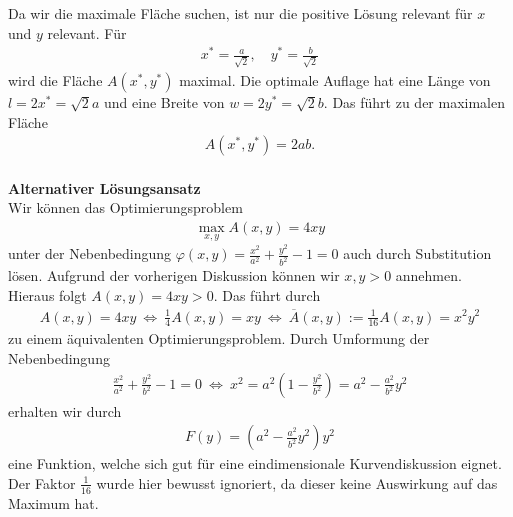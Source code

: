 Da wir die maximale Fläche suchen, ist nur die positive Lösung relevant für $ x $ und $ y $ relevant. Für 
\begin{align*}
	x^\ast = \frac{a}{\sqrt{2}}, \quad y^\ast = \frac{b}{\sqrt{2}}
\end{align*}  
wird die Fläche $ A(x^\ast, y^\ast ) $ maximal. Die optimale Auflage hat eine Länge von $ l = 2 x^\ast = \sqrt{2} a  $ und eine Breite von $ w = 2 y^\ast = \sqrt{2} b  $.
Das führt zu der maximalen Fläche 
\begin{align*}
	A(x^\ast, y^\ast) = 2 ab.
\end{align*}
\ \\
\textbf{Alternativer Lösungsansatz}\\
Wir können das Optimierungsproblem
\begin{align*}
	\max \limits_{x,y} A(x,y) = 4 xy
\end{align*}
unter der Nebenbedingung $ \varphi(x,y) = \frac{x^2}{a^2} + \frac{y^2}{b^2} - 1 = 0$ auch durch Substitution lösen. Aufgrund der vorherigen Diskussion können wir $ x,y > 0 $ annehmen. Hieraus folgt $ A(x,y) = 4 xy > 0 $. Das führt durch
\begin{align*}
	A(x,y) = 4 xy \ \Leftrightarrow \
	\frac{1}{4} A(x,y) = xy
	\ \Leftrightarrow \
	\overline{A}(x,y) := \frac{1}{16}A(x,y) = x^2 y^2
\end{align*}
zu einem äquivalenten Optimierungsproblem. Durch Umformung der Nebenbedingung
\begin{align*}
	\frac{x^2}{a^2} + \frac{y^2}{b^2} - 1 = 0 
	\ \Leftrightarrow \
	x^2 = a^2\left(1 - \frac{y^2}{b^2} \right) = a^2 - \frac{a^2}{b^2} y^2
\end{align*}
erhalten wir durch
\begin{align*} 
	F(y) = \left(a^2 - \frac{a^2}{b^2} y^2\right) y^2
\end{align*}
eine Funktion, welche sich gut für eine eindimensionale Kurvendiskussion eignet. Der Faktor $ \frac{1}{16} $ wurde hier bewusst ignoriert, da dieser keine Auswirkung auf das Maximum hat.
\newpage

